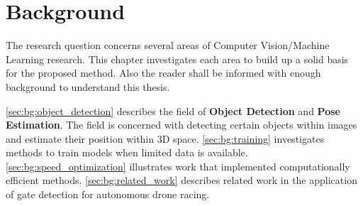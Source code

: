 \chapter{Background}
\label{sec:background}
	The research question concerns several areas of Computer Vision/Machine Learning research. This chapter investigates each area to build up a solid basis for the proposed method. Also the reader shall be informed with enough background to understand this thesis.
	
	\autoref{sec:bg:object_detection} describes the field of \textbf{Object Detection} and \textbf{Pose Estimation}. The field is concerned with detecting certain objects within images and estimate their position within 3D space. \autoref{sec:bg:training} investigates methods to train models when limited data is available. \autoref{sec:bg:speed_optimization} illustrates work that implemented computationally efficient methods. \autoref{sec:bg:related_work} describes related work in the application of gate detection for autonomous drone racing.



